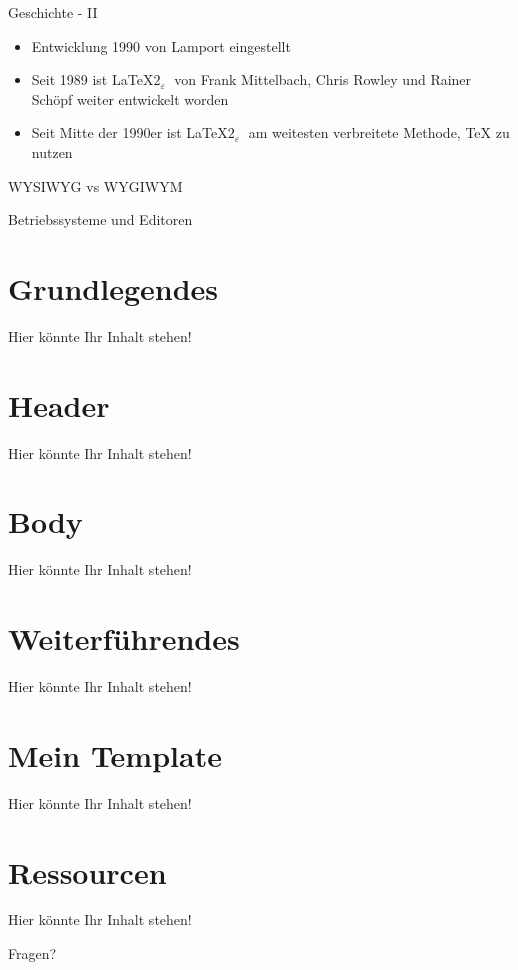 \documentclass{beamer}
\begin{document}
\begin{frame}{Geschichte - II}
\begin{itemize}
\item Entwicklung 1990 von Lamport eingestellt
\item Seit 1989 ist \LaTeX $2_{\varepsilon}\;$ von Frank Mittelbach, Chris Rowley und Rainer Schöpf weiter entwickelt worden
\item Seit Mitte der 1990er ist \LaTeX $2_{\varepsilon}\;$ am weitesten verbreitete Methode, \TeX\; zu nutzen
\end{itemize}
\end{frame}

\begin{frame}{WYSIWYG vs WYGIWYM}

\end{frame}

\begin{frame}{Betriebssysteme und Editoren}

\end{frame}

\section{Grundlegendes}
\begin{frame}
Hier könnte Ihr Inhalt stehen!
\end{frame}

\section{Header}
\begin{frame}
Hier könnte Ihr Inhalt stehen!
\end{frame}

\section{Body}
\begin{frame}
Hier könnte Ihr Inhalt stehen!
\end{frame}

\section{Weiterführendes}
\begin{frame}
Hier könnte Ihr Inhalt stehen!
\end{frame}

\section{Mein Template}
\begin{frame}
Hier könnte Ihr Inhalt stehen!
\end{frame}

\section{Ressourcen}
\begin{frame}
Hier könnte Ihr Inhalt stehen!
\end{frame}

\begin{frame}
\begin{center}
\huge{Fragen?}
\end{center}
\end{frame}
\end{document}
